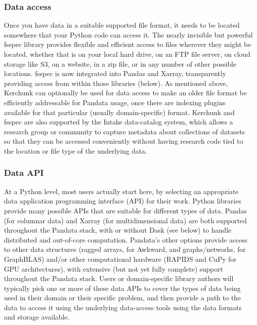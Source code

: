 \subsubsection{Data access}

Once you have data in a suitable supported file format, it needs to be located somewhere that your Python code can access it. The nearly invisible but powerful fsspec library provides flexible and efficient access to files wherever they might be located, whether that is on your local hard drive, on an FTP file server, on cloud storage like S3, on a website, in a zip file, or in any number of other possible locations. fsspec is now integrated into Pandas and Xarray, transparently providing access from within those libraries (below). As mentioned above, Kerchunk can optionally be used for data access to make an older file format be efficiently addressable for Pandata usage, once there are indexing plugins available for that particular (usually domain-specific) format. Kerchunk and fsspec are also supported by the Intake data-catalog system, which allows a research group or community to capture metadata about collections of datasets so that they can be accessed conveniently without having research code tied to the location or file type of the underlying data.

\subsubsection{Data API}

At a Python level, most users actually start here, by selecting an appropriate data application programming interface (API) for their work. Python libraries provide many possible APIs that are suitable for different types of data. Pandas (for columnar data) and Xarray (for multidimensional data) are both supported throughout the Pandata stack, with or without Dask (see below) to handle distributed and out-of-core computation. Pandata's other options provide access to other data structures (ragged arrays, for Awkward, and graphs/networks, for GraphBLAS) and/or other computational hardware (RAPIDS and CuPy for GPU architectures), with extensive (but not yet fully complete) support throughout the Pandata stack. Users or domain-specific library authors will typically pick one or more of these data APIs to cover the types of data being used in their domain or their specific problem, and then provide a path to the data to access it using the underlying data-access tools using the data formats and storage available.

